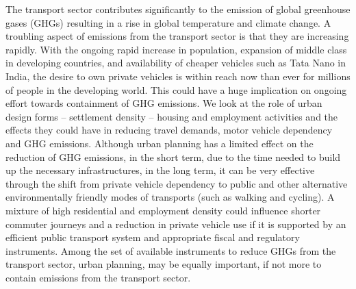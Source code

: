 The transport sector contributes significantly to the emission of global greenhouse gases (GHGs) resulting in a rise in global temperature and climate change. A troubling aspect of emissions from the transport sector is that they are increasing rapidly. With the ongoing rapid increase in population, expansion of middle class in developing countries, and availability of cheaper vehicles such as Tata Nano in India, the desire to own private vehicles is within reach now than ever for millions of people in the developing world. This could have a huge implication on ongoing effort towards containment of GHG emissions. We look at the role of urban design forms – settlement density – housing and employment activities and the effects they could have in reducing travel demands, motor vehicle dependency and GHG emissions. Although urban planning has a limited effect on the reduction of GHG emissions, in the short term, due to the time needed to build up the necessary infrastructures, in the long term, it can be very effective through the shift from private vehicle dependency to public and other alternative environmentally friendly modes of transports (such as walking and cycling). A mixture of high residential and employment density could influence shorter commuter journeys and a reduction in private vehicle use if it is supported by an efficient public transport system and appropriate fiscal and regulatory instruments. Among the set of available instruments to reduce GHGs from the transport sector, urban planning, may be equally important, if not more to contain emissions from the transport sector.
